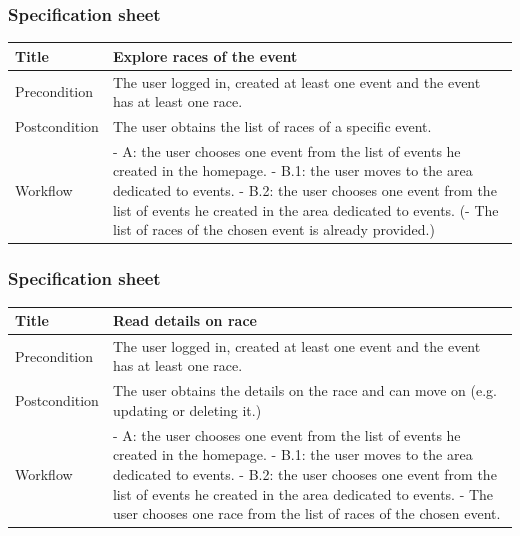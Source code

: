 \documentclass{beamer}
\begin{document}
\begin{frame}
    \frametitle{Specification sheet}
    \begin{table}
        \tiny
        \begin{tabular}{|p{2cm}|p{6cm}|}
        \hline
        Title & \textbf{Explore races of the event} \\
        \hline
        Precondition & The user logged in, created at least one event and the event has at least one race. \\
        \hline
        Postcondition & The user obtains the list of races of a specific event. \\
        \hline
        Workflow &
        - A: the user chooses one event from the list of events he created in the homepage. \newline
        - B.1: the user moves to the area dedicated to events. \newline
        - B.2: the user chooses one event from the list of events he created in the area dedicated to events. \newline
        (- The list of races of the chosen event is already provided.) \\
        \hline
        \end{tabular}
\end{table}
\end{frame}

\begin{frame}
    \frametitle{Specification sheet}
    \begin{table}
        \tiny
        \begin{tabular}{|p{2cm}|p{6cm}|}
        \hline
        Title & \textbf{Read details on race} \\
        \hline
        Precondition & The user logged in, created at least one event and the event has at least one race. \\
        \hline
        Postcondition & The user obtains the details on the race and can move on (e.g. updating or deleting it.) \\
        \hline
        Workflow &
        - A: the user chooses one event from the list of events he created in the homepage. \newline
        - B.1: the user moves to the area dedicated to events. \newline
        - B.2: the user chooses one event from the list of events he created in the area dedicated to events. \newline
        - The user chooses one race from the list of races of the chosen event. \\
        \hline
        \end{tabular}
\end{table}
\end{frame}
\end{document}
